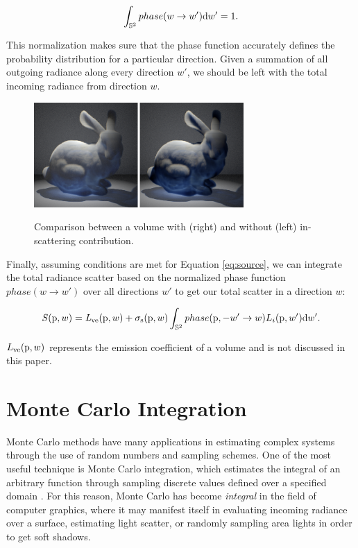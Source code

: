 \documentclass[12pt]{ucthesis}
\newcommand{\captionfonts}{\small\bf\ssp}
\begin{document}
\begin{equation}
\int_{\mathbb{S}^2}phase(w \to w')\textup{d}w' = 1.
\label{eq:source}
\end{equation}

This normalization makes sure that the phase function accurately defines the probability distribution for a particular direction.  Given a summation of all outgoing radiance along every direction $w'$, we should be left with the total incoming radiance from direction $w$.

\begin{figure}[h!]
    \centering
    \includegraphics[width=80mm]{img/inscat_comp.png}
    \captionfonts
    \caption{Comparison between a volume with (right) and without (left) in-scattering contribution.}
    \label{fig:inscat_comp}
\end{figure}

Finally, assuming conditions are met for Equation \ref{eq:source}, we can integrate the total radiance scatter based on the normalized phase function $phase(w \to w')$ over all directions $w'$ to get our total scatter in a direction $w$:

\begin{displaymath}
\mathit{S}(\textup{p},w) = \mathit{L}_{\textup{ve}}(\textup{p},w) + \sigma_{\textup{s}}(\textup{p}, w) \int_{\mathbb{S}^2} phase(\textup{p}, -w' \to w) L_{i}(\textup{p},w')\textup{d}w'.
\end{displaymath}

$L_{\textup{ve}}(\textup{p}, w)$ represents the emission coefficient of a volume and is not discussed in this paper.


\section{Monte Carlo Integration}

Monte Carlo methods have many applications in estimating complex systems through the use of random numbers and sampling schemes.  One of the most useful technique is Monte Carlo integration, which estimates the integral of an arbitrary function through sampling discrete values defined over a specified domain \cite{aga}.  For this reason, Monte Carlo has become \textit{integral} in the field of computer graphics, where it may manifest itself in evaluating incoming radiance over a surface, estimating light scatter, or randomly sampling area lights in order to get soft shadows.
\end{document}
